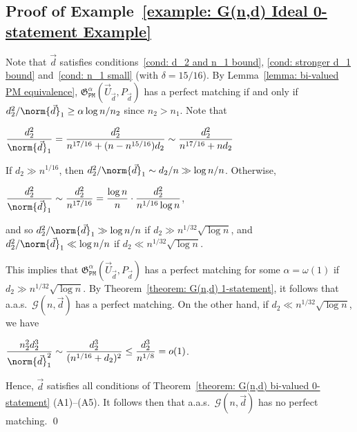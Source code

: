 \documentclass[12pt]{article}
\begin{document}
\subsection{Proof of Example~\ref{example: G(n,d) Ideal 0-statement Example}}
\label{section: Proof of G(n,d) concrete threshold}


Note that $\vec{d}$ satisfies conditions~\ref{cond: d_2 and n_1 bound}, \ref{cond: stronger d_1 bound} and~\ref{cond: n_1 small} (with $\delta = 15/16$).
By Lemma~\ref{lemma: bi-valued PM equivalence}, $\mathfrak{G}_{\texttt{PM}}^{\alpha}(\vec{U}_{\vec{d}}, P_{\vec{d}})$ has a perfect matching if and only if $d_2^2/\norm{\vec{d}}_1\geq\alpha\log n/n_2$ since $n_2 > n_1$. Note that
\begin{center}
    $\displaystyle\frac{d_2^2}{\norm{\vec{d}}_1} = \frac{d_2^2}{n^{17/16} + (n - n^{15/16}) d_2}\sim \frac{d_2^2}{n^{17/16} + nd_2}$
\end{center}
If $d_2\gg n^{1/16}$, then $d_2^2/\norm{\vec{d}}_1\sim d_2/n\gg\log n/n$. Otherwise,
\begin{center}
    $\displaystyle\frac{d_2^2}{\norm{\vec{d}}_1}\sim\frac{d_2^2}{n^{17/16}} = \frac{\log n}{n}\cdot\frac{d_2^2}{n^{1/16}\log n}$,
\end{center}
and so $d_2^2/\norm{\vec{d}}_1\gg\log n/n$ if $d_2\gg n^{1/32}\sqrt{\log n}$, and $d_2^2/\norm{\vec{d}}_1\ll\log n/n$ if $d_2\ll n^{1/32}\sqrt{\log n}$. 

This implies that $\mathfrak{G}_{\texttt{PM}}^{\alpha}(\vec{U}_{\vec{d}}, P_{\vec{d}})$ has a perfect matching for some $\alpha = \omega(1)$ if $d_2\gg n^{1/32}\sqrt{\log n}$. By Theorem~\ref{theorem: G(n,d) 1-statement}, it follows that a.a.s.\ $\mathcal{G}(n,\vec{d})$ has a perfect matching. On the other hand, if $d_2\ll n^{1/32}\sqrt{\log n}$, we have
\begin{center}
    $\displaystyle\frac{n_2^2 d_2^3}{\norm{\vec{d}}^2_1}\sim\frac{d_2^3}{(n^{1/16}+d_2)^2}\leq \frac{d_2^3}{n^{1/8}} = o(1)$.
\end{center}
Hence, $\vec{d}$ satisfies all conditions of Theorem~\ref{theorem: G(n,d) bi-valued 0-statement} (A1)--(A5). It follows then that a.a.s.\ $\mathcal{G}(n,\vec{d})$ has no perfect matching. \qed





\end{document}

